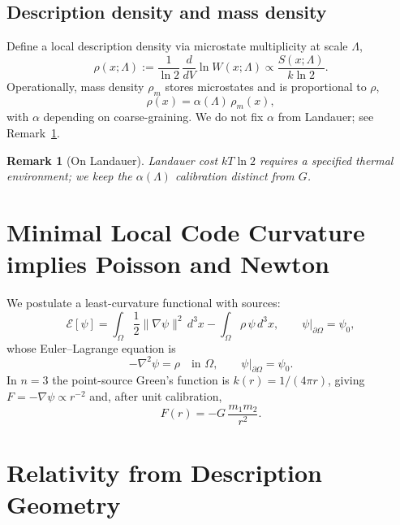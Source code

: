 \documentclass[aps,preprint,onecolumn,longbibliography,nofootinbib]{revtex4-2}
\numberwithin{equation}{section}        %
\newtheorem{remark}{Remark}
\begin{document}
\subsection{Description density and mass density}
Define a local description density via microstate multiplicity at scale $\Lambda$,
\begin{equation}
\rho(x;\Lambda) := \frac{1}{\ln 2}\,\frac{d}{dV}\ln W(x;\Lambda)\propto \frac{S(x;\Lambda)}{k\ln 2}.
\end{equation}
Operationally, mass density $\rho_m$ stores microstates and is proportional to $\rho$,
\begin{equation}
\rho(x) = \alpha(\Lambda)\,\rho_m(x), \label{eq:rho}
\end{equation}
with $\alpha$ depending on coarse-graining. We do not fix $\alpha$ from Landauer; see Remark~\ref{rmk:landauer}.

\begin{remark}[On Landauer]\label{rmk:landauer}
Landauer cost $kT\ln 2$ requires a specified thermal environment; we keep the $\alpha(\Lambda)$ calibration distinct from $G$.
\end{remark}

\section{Minimal Local Code Curvature implies Poisson and Newton}
We postulate a least-curvature functional with sources:
\begin{equation}
\mathcal{E}[\psi]=\int_{\Omega}\frac{1}{2}\|\nabla \psi\|^2\,d^3x - \int_{\Omega}\rho\,\psi\,d^3x, \qquad \psi|_{\partial\Omega}=\psi_0, \label{eq:dirichlet}
\end{equation}
whose Euler--Lagrange equation is
\begin{equation}
-\nabla^2\psi=\rho \quad \text{in }\Omega,\qquad \psi|_{\partial\Omega}=\psi_0. \label{eq:poisson}
\end{equation}
In $n=3$ the point-source Green's function is $k(r)=1/(4\pi r)$, giving $F=-\nabla\psi \propto r^{-2}$ and, after unit calibration,
\begin{equation}
F(r) = -G\,\frac{m_1 m_2}{r^2}. \label{eq:newton}
\end{equation}

\section{Relativity from Description Geometry}
\end{document}
